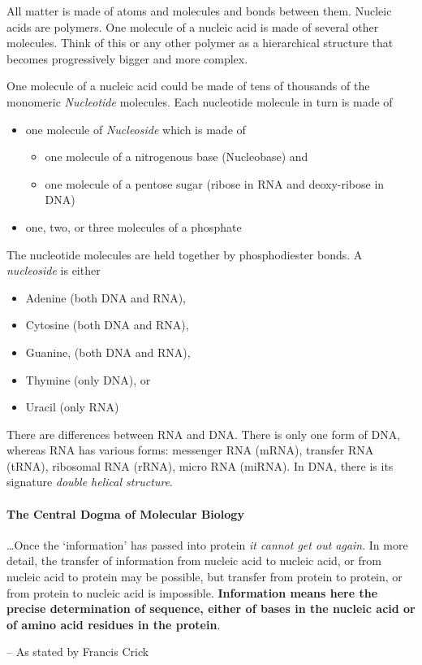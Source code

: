 
All matter is made of atoms and molecules and bonds between them. Nucleic acids are polymers. One molecule of a nucleic acid is made of several other molecules. Think of this or any other polymer as a hierarchical structure that becomes progressively bigger and more complex.

One molecule of a nucleic acid could be made of tens of thousands of the monomeric \emph{Nucleotide} molecules. Each nucleotide molecule in turn is made of 
\begin{itemize}
    \item one molecule of \emph{Nucleoside} which is made of
        \begin{itemize}
            \item one molecule of a nitrogenous base (Nucleobase) and
            \item one molecule of a pentose sugar (ribose in RNA and deoxy-ribose in DNA)
        \end{itemize}
    \item one, two, or three molecules of a phosphate 
\end{itemize}

The nucleotide molecules are held together by phosphodiester bonds. A \emph{nucleoside} is either
\begin{itemize}
    \item Adenine (both DNA and RNA),
    \item Cytosine (both DNA and RNA),
    \item Guanine, (both DNA and RNA),
    \item Thymine (only DNA), or
    \item Uracil (only RNA)
\end{itemize}

There are differences between RNA and DNA. There is only one form of DNA, whereas RNA has various forms: messenger RNA (mRNA), transfer RNA (tRNA), ribosomal RNA (rRNA), micro RNA (miRNA). In DNA, there is its signature \emph{double helical structure}. 


\paragraph{The Central Dogma of Molecular Biology}
\label{para: central-dogma}
\epigraph
{
    \dots Once the `information' has passed into protein \textit{it cannot get out again}. In more detail, the transfer of information from nucleic acid to nucleic acid, or from nucleic acid to protein may be possible, but transfer from protein to protein, or from protein to nucleic acid is impossible. \textbf{Information means here the precise determination of sequence, either of bases in the nucleic acid or of amino acid residues in the protein}.
}
{
    -- As stated by Francis Crick \cite{the-central-dogma}
}

